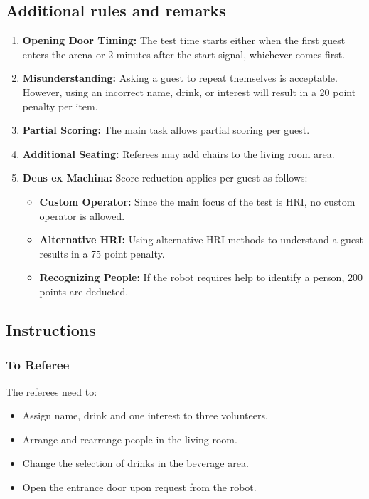 \subsection*{Additional rules and remarks}
\begin{enumerate}[nosep]
	\item \textbf{Opening Door Timing:} The test time starts either when the first guest enters the arena or 2 minutes after the start signal, whichever comes first.

	\item \textbf{Misunderstanding:} Asking a guest to repeat themselves is acceptable. However, using an incorrect name, drink, or interest will result in a 20 point penalty per item.
		
	\item \textbf{Partial Scoring:} The main task allows partial scoring per guest.

	\item \textbf{Additional Seating:} Referees may add chairs to the living room area.
	
	\item \textbf{Deus ex Machina:} Score reduction applies per guest as follows:
	\begin{itemize}[nosep]
		\item \textbf{Custom Operator:} Since the main focus of the test is HRI, no custom operator is allowed.
		\item \textbf{Alternative HRI:} Using alternative HRI methods to understand a guest results in a 75 point penalty.
		\item \textbf{Recognizing People:} If the robot requires help to identify a person, 200 points are deducted.
	\end{itemize}
\end{enumerate}


\subsection*{Instructions}

\subsubsection*{To Referee}

The referees need to:
\begin{itemize}
	\item Assign name, drink and one interest to three volunteers.
	\item Arrange and rearrange people in the living room.
	\item Change the selection of drinks in the beverage area.
	\item Open the entrance door upon request from the robot.
\end{itemize}

